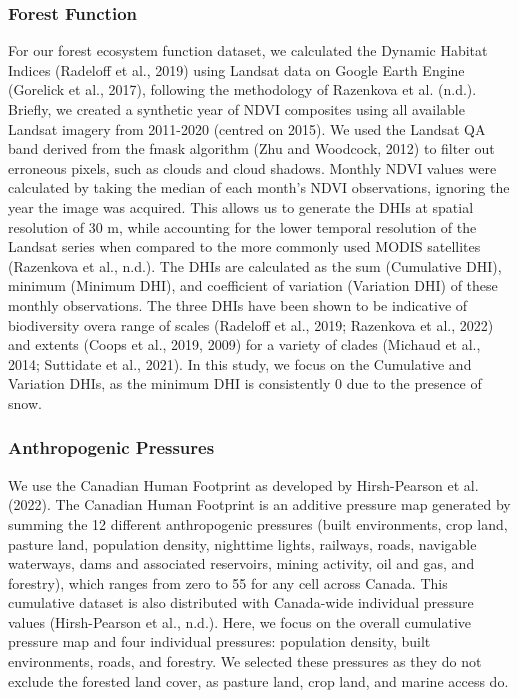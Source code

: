 \documentclass[
]{agujournal2019}
\begin{document}
\subsubsection{Forest Function}\label{forest-function}

For our forest ecosystem function dataset, we calculated the Dynamic
Habitat Indices (Radeloff et al., 2019) using Landsat data on Google
Earth Engine (Gorelick et al., 2017), following the methodology of
Razenkova et al. (n.d.). Briefly, we created a synthetic year of NDVI
composites using all available Landsat imagery from 2011-2020 (centred
on 2015). We used the Landsat QA band derived from the fmask algorithm
(Zhu and Woodcock, 2012) to filter out erroneous pixels, such as clouds
and cloud shadows. Monthly NDVI values were calculated by taking the
median of each month's NDVI observations, ignoring the year the image
was acquired. This allows us to generate the DHIs at spatial resolution
of 30 m, while accounting for the lower temporal resolution of the
Landsat series when compared to the more commonly used MODIS satellites
(Razenkova et al., n.d.). The DHIs are calculated as the sum (Cumulative
DHI), minimum (Minimum DHI), and coefficient of variation (Variation
DHI) of these monthly observations. The three DHIs have been shown to be
indicative of biodiversity overa range of scales (Radeloff et al., 2019;
Razenkova et al., 2022) and extents (Coops et al., 2019, 2009) for a
variety of clades (Michaud et al., 2014; Suttidate et al., 2021). In
this study, we focus on the Cumulative and Variation DHIs, as the
minimum DHI is consistently 0 due to the presence of snow.

\subsubsection{Anthropogenic Pressures}\label{anthropogenic-pressures}

We use the Canadian Human Footprint as developed by Hirsh-Pearson et al.
(2022). The Canadian Human Footprint is an additive pressure map
generated by summing the 12 different anthropogenic pressures (built
environments, crop land, pasture land, population density, nighttime
lights, railways, roads, navigable waterways, dams and associated
reservoirs, mining activity, oil and gas, and forestry), which ranges
from zero to 55 for any cell across Canada. This cumulative dataset is
also distributed with Canada-wide individual pressure values
(Hirsh-Pearson et al., n.d.). Here, we focus on the overall cumulative
pressure map and four individual pressures: population density, built
environments, roads, and forestry. We selected these pressures as they
do not exclude the forested land cover, as pasture land, crop land, and
marine access do.
\end{document}
